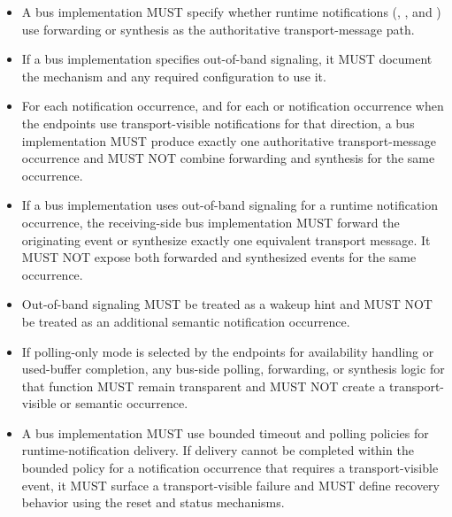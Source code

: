 \begin{itemize}
  \item A bus implementation MUST specify whether runtime notifications
        (, , and )
        use forwarding or synthesis as the authoritative transport-message path.
  \item If a bus implementation specifies out-of-band signaling, it MUST
        document the mechanism and any required configuration to use it.
  \item For each  notification occurrence, and for each
         or  notification occurrence
        when the endpoints use transport-visible notifications for that
        direction, a bus implementation MUST produce exactly one authoritative
        transport-message occurrence and MUST NOT combine forwarding and
        synthesis for the same occurrence.
  \item If a bus implementation uses out-of-band signaling for a runtime
        notification occurrence, the receiving-side bus implementation MUST
        forward the originating event or synthesize exactly one equivalent
        transport message. It MUST NOT expose both forwarded and synthesized
        events for the same occurrence.
  \item Out-of-band signaling MUST be treated as a wakeup hint and MUST NOT be
        treated as an additional semantic notification occurrence.
  \item If polling-only mode is selected by the endpoints for availability
        handling or used-buffer completion, any bus-side polling, forwarding,
        or synthesis logic for that function MUST remain transparent and MUST
        NOT create a transport-visible  or
         semantic occurrence.
  \item A bus implementation MUST use bounded timeout and polling policies for
        runtime-notification delivery. If delivery cannot be completed within
        the bounded policy for a notification occurrence that requires a
        transport-visible event, it MUST surface a transport-visible failure
        and MUST define recovery behavior using the reset and status
        mechanisms.
\end{itemize}

